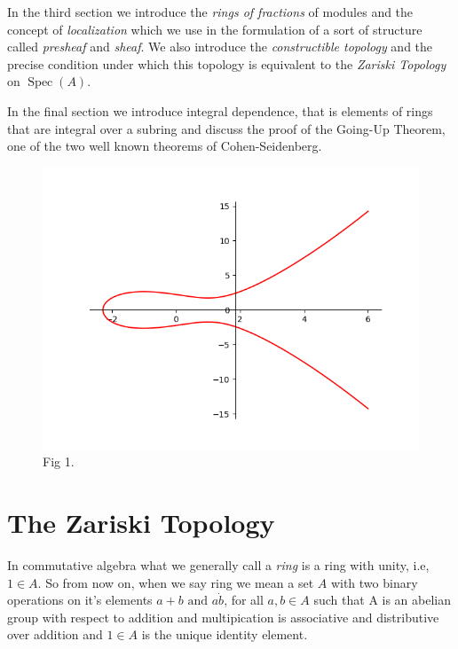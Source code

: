 \documentclass[]{report}
\DeclareMathOperator\Spec{Spec}
\begin{document}
    In the third section we introduce the \textit{rings of fractions} of modules and the concept of \textit{localization} which we use in the formulation of a sort of structure called \textit{presheaf} and \textit{sheaf}. We also introduce the \textit{constructible topology} and the precise condition under which this topology is equivalent to the \textit{Zariski Topology} on $\Spec(A)$. 

    In the final section we introduce integral dependence, that is elements of rings that are integral over a subring and discuss the proof of the Going-Up Theorem, one of the two well known theorems of Cohen-Seidenberg. 


\begin{figure}
  \includegraphics[width=\linewidth]{img/ell_curv1.png}
  \caption{Fig 1.}
  \label{fig:ell_curv1}
\end{figure}

\chapter {The Zariski Topology}

In commutative algebra what we generally call a \textit{ring} is a ring with unity, i.e, $1\in A$. So from now on, when we say ring we mean a set $A$ with two binary operations on it's elements $a + b \text{ and } a\dot b$, for all $a,b\in A$ such that A is an abelian group with respect to addition and multipication is associative and distributive over addition and $1\in A$ is the unique identity element.
\end{document}
